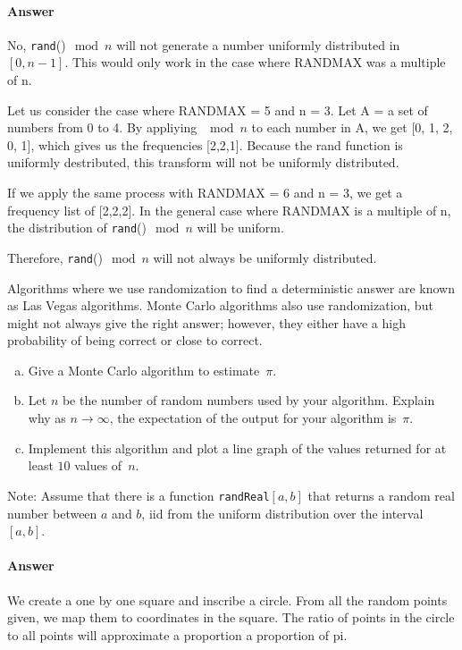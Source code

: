 \documentclass{article}
\begin{document}

\paragraph{Answer}
No, \texttt{rand}()$\mod n$ will not generate a number uniformly distributed in
$[0,n-1]$. This would only work in the case where RANDMAX was a multiple of n.

Let us consider the case where RANDMAX = 5 and n = 3. Let A = a set of numbers from
0 to 4. By appliying $\mod n$ to each number in A, we get [0, 1, 2, 0, 1], which
gives us the frequencies [2,2,1]. Because the rand function is uniformly destributed,
this transform will not be uniformly distributed.

If we apply the same process with RANDMAX = 6 and n = 3, we get a frequency list of
[2,2,2]. In the general case where RANDMAX is a multiple of n, the distribution of
\texttt{rand}()$\mod n$ will be uniform.

Therefore, \texttt{rand}()$\mod n$ will not always be uniformly distributed.



\collab{\todo{}}
\nextprob{}

Algorithms where we use randomization to find a deterministic answer are known
as Las Vegas algorithms.  Monte Carlo algorithms also use randomization, but
might not always give the right answer; however, they either have a high
probability of being correct or close to correct.

\begin{enumerate}[(a)]
    \item Give a Monte Carlo algorithm to estimate~$\pi$.
    \item Let $n$ be the number of random numbers used by your algorithm.
        Explain why as $n \to \infty$, the expectation of the output for your
        algorithm is~$\pi$.
    \item Implement this algorithm and plot a line graph of
        the values returned for at least $10$ values of~$n$.
\end{enumerate}

Note: Assume that there is a function \texttt{randReal}$[a,b]$ that returns a random
real number between $a$ and $b$, iid from the uniform distribution over the
interval $[a,b]$.

\paragraph{Answer}
We create a one by one square and inscribe a circle. From all the random points
given, we map them to coordinates in the square. The ratio of points in the circle
to all points will approximate a proportion a proportion of pi.
\end{document}

